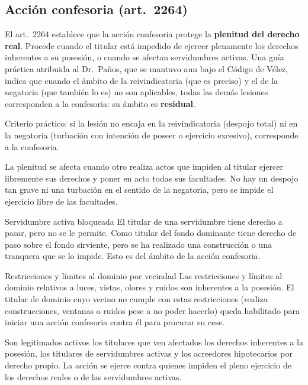 \documentclass[12pt,oneside]{book}
\begin{document}
\subsection{Acción confesoria (art.~2264)}

El art.~2264 establece que la acción confesoria protege la \textbf{plenitud del derecho real}. Procede cuando el titular está impedido de ejercer plenamente los derechos inherentes a su posesión, o cuando se afectan servidumbres activas. Una guía práctica atribuida al Dr.~Paños, que se mantuvo aun bajo el Código de Vélez, indica que cuando el ámbito de la reivindicatoria (que es preciso) y el de la negatoria (que también lo es) no son aplicables, todas las demás lesiones corresponden a la confesoria: su ámbito es \textbf{residual}.

\begin{importante}
Criterio práctico: si la lesión no encaja en la reivindicatoria (despojo total) ni en la negatoria (turbación con intención de poseer o ejercicio excesivo), corresponde a la confesoria.
\end{importante}

La plenitud se afecta cuando otro realiza actos que impiden al titular ejercer libremente sus derechos y poner en acto todas sus facultades. No hay un despojo tan grave ni una turbación en el sentido de la negatoria, pero se impide el ejercicio libre de las facultades.

\begin{ejemplo}{Servidumbre activa bloqueada}
El titular de una servidumbre tiene derecho a pasar, pero no se le permite. Como titular del fondo dominante tiene derecho de paso sobre el fondo sirviente, pero se ha realizado una construcción o una tranquera que se lo impide. Esto es del ámbito de la acción confesoria.
\end{ejemplo}

\begin{ejemplo}{Restricciones y límites al dominio por vecindad}
Las restricciones y límites al dominio relativos a luces, vistas, olores y ruidos son inherentes a la posesión. El titular de dominio cuyo vecino no cumple con estas restricciones (realiza construcciones, ventanas o ruidos pese a no poder hacerlo) queda habilitado para iniciar una acción confesoria contra él para procurar su cese.
\end{ejemplo}

Son legitimados activos los titulares que ven afectados los derechos inherentes a la posesión, los titulares de servidumbres activas y los acreedores hipotecarios por derecho propio. La acción se ejerce contra quienes impiden el pleno ejercicio de los derechos reales o de las servidumbres activas.
\end{document}
